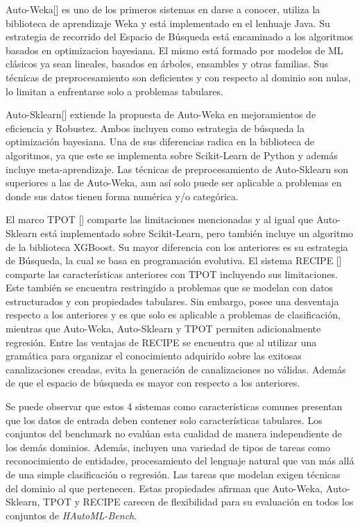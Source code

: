 Auto-Weka[\cite{8}] es uno de los primeros sistemas en darse a conocer, utiliza la biblioteca de aprendizaje Weka y está implementado en el lenhuaje Java. 
Su estrategia de recorrido del Espacio de Búsqueda está encaminado a los algoritmos basados en optimizacion bayesiana. El mismo está formado por modelos de ML 
clásicos ya sean lineales, basados en árboles, ensambles y otras familias. Sus técnicas de preprocesamiento son deficientes y con respecto al dominio son nulas, 
lo limitan a enfrentarse solo a problemas tabulares.

Auto-Sklearn[\cite{9}] extiende la propuesta de Auto-Weka en mejoramientos de eficiencia y Robustez. Ambos incluyen como estrategia de búsqueda la optimización 
bayesiana. Una de sus diferencias radica en la biblioteca de algoritmos, ya que este se implementa sobre Scikit-Learn de Python y además incluye meta-aprendizaje. 
Las técnicas de preprocesamiento de Auto-Sklearn son superiores a las de Auto-Weka, aun así solo puede ser aplicable a problemas en donde sus datos tienen forma 
numérica y/o categórica. 

El marco TPOT [\cite{65}] comparte las limitaciones mencionadas y al igual que Auto-Sklearn está implementado sobre Scikit-Learn, pero también incluye un algoritmo de 
la biblioteca XGBoost. Su mayor diferencia con los anteriores es su estrategia de Búsqueda, la cual se basa en programación evolutiva. 
El sistema RECIPE [\cite{64}] comparte las características anteriores con TPOT incluyendo sus limitaciones. Este también se encuentra restringido a problemas que se 
modelan con datos estructurados y con propiedades tabulares. Sin embargo, posee una desventaja respecto a los anteriores y es que solo es aplicable a problemas de 
clasificación, mientras que Auto-Weka, Auto-Sklearn y TPOT permiten adicionalmente regresión. Entre las ventajas de RECIPE se encuentra que al utilizar una 
gramática para organizar el conocimiento adquirido sobre las exitosas canalizaciones creadas, evita la generación de canalizaciones no válidas. Además de que el 
espacio de búsqueda es mayor con respecto a los anteriores.

Se puede observar que estos 4 sistemas como características comunes presentan que los datos de entrada deben contener solo características tabulares.
Los conjuntos del benchmark no evalúan esta cualidad de manera independiente de los demás dominios. Además, incluyen una variedad de tipos de tareas como 
reconocimiento de entidades, procesamiento del lenguaje natural que van más allá de una simple clasificación o regresión. Las tareas que modelan 
exigen técnicas del dominio al que pertenecen. Estas propiedades afirman que Auto-Weka, Auto-Sklearn, TPOT y RECIPE carecen de flexibilidad para 
su evaluación en todos los conjuntos de \textit{HAutoML-Bench}.

